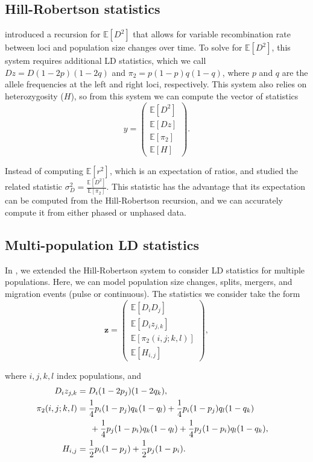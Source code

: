 \documentclass[10pt]{article}
\newcommand{\E}{\mathbb{E}}
\begin{document}
\subsection{Hill-Robertson statistics}

\citet{Hill1968} introduced a recursion for $\E[D^2]$ that allows for variable recombination rate between loci and population size changes over time.
To solve for $\E[D^2]$, this system requires additional LD statistics, which we call $Dz = D(1-2p)(1-2q)$ and $\pi_2 = p(1-p)q(1-q)$, where $p$ and $q$ are the allele frequencies at the left and right loci, respectively.
This system also relies on heterozygosity ($H$), so from this system we can compute the vector of statistics
$$y=\begin{pmatrix} \E[D^2] \\ \E[Dz] \\ \E[\pi_2] \\ \E[H] \end{pmatrix}.$$

Instead of computing $\E[r^2]$, which is an expectation of ratios, \citet{Hill1968} and \citet{Ohta1971} studied the related statistic $\sigma_D^2 = \frac{\E[D^2]}{\E[\pi_2]}$.
This statistic has the advantage that its expectation can be computed from the Hill-Robertson recursion, and we can accurately compute it from either phased or unphased data.

\subsection{Multi-population LD statistics}

In \citet{Ragsdale2018}, we extended the Hill-Robertson system to consider LD statistics for multiple populations.
Here, we can model population size changes, splits, mergers, and migration events (pulse or continuous).
The statistics we consider take the form
$$
\mathbf{z} = \begin{pmatrix} 
\E[D_i D_j] \\
\E[D_i z_{j,k}] \\
\E[{\pi_2}(i,j;k,l)] \\
\E[H_{i,j}]
\end{pmatrix},
$$

where $i,j,k,l$ index populations, and
\begin{align*}
 D_iz_{j,k} & = D_i (1-2p_j)(1-2q_k), \\
 {\pi_2}(i,j;k,l) & = \frac{1}{4} p_i(1-p_j) q_k(1-q_l) + \frac{1}{4} p_i(1-p_j) q_l(1-q_k) & \\
					&\hspace{15 pt} + \frac{1}{4} p_j(1-p_i) q_k(1-q_l) + \frac{1}{4} p_j(1-p_i) q_l(1-q_k) , \\
 H_{i,j} & =\frac{1}{2}p_i(1-p_j) + \frac{1}{2}p_j(1-p_i).
\end{align*}
\end{document}
